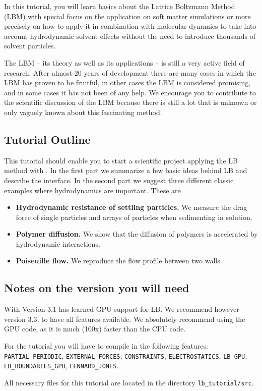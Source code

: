 In this tutorial, you will learn basics about the 
Lattice Boltzmann Method (LBM) with special focus on the application
on soft matter simulations or more precisely on how to apply it 
in combination with molecular dynamics to take into account 
hydrodynamic solvent effects without the need to introduce
thousands of solvent particles. 

The LBM -- its theory as well as its applications -- is 
still a very active field of research. After almost 20 years
of development there are many cases in which the LBM has proven
to be fruitful, in other cases the LBM is considered promising,
and in some cases it has not been of any help. We
encourage you to contribute to the scientific discussion 
of the LBM because there is still a lot 
that is unknown or only vaguely known about this fascinating
method. 

\subsection*{Tutorial Outline}
This tutorial should enable you to start a scientific project applying
the LB method with \ES{}. In the first part we summarize a few basic ideas behind LB 
and describe the interface. In the second part we suggest three
different classic examples where hydrodynamics are important. These are
\begin{itemize}
  \item \textbf{Hydrodynamic resistance of settling particles.} We measure the drag
   force of single particles and arrays of particles when sedimenting
   in solution.
  \item \textbf{Polymer diffusion.} We show that the diffusion of polymers is accelerated 
    by hydrodynamic interactions.
  \item \textbf{Poiseuille flow.} We reproduce the flow profile between two walls.
\end{itemize}

\subsection*{Notes on the \ES{} version you will need}
With Version 3.1 \ES{} has learned GPU support for LB. We recommend however
version 3.3, to have all features available. We absolutely recommend using 
the GPU code, as it is much (100x) faster than the CPU code.

For the tutorial you will have to compile in the following  features:
\texttt{PARTIAL\_PERIODIC}, \texttt{EXTERNAL\_FORCES}, \texttt{CONSTRAINTS}, \texttt{ELECTROSTATICS}, 
\texttt{LB\_GPU}, \texttt{LB\_BOUNDARIES\_GPU},  \texttt{LENNARD\_JONES}.

All necessary files for this tutorial are located in the directory \texttt{lb\_tutorial/src}.
\pagebreak


